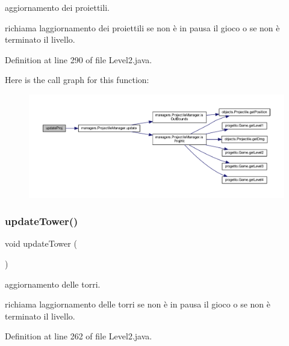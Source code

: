 aggiornamento dei proiettili. 

richiama l\textquotesingle{}aggiornamento dei proiettili se non è in pausa il gioco o se non è terminato il livello. 

Definition at line 290 of file Level2.\+java.

Here is the call graph for this function\+:
\nopagebreak
\begin{figure}[H]
\begin{center}
\leavevmode
\includegraphics[width=350pt]{classscenes_1_1_level2_ac83c203b559f6fd0bb225744d7ccf854_cgraph}
\end{center}
\end{figure}
\mbox{\label{classscenes_1_1_level2_ae4fd4a959e4d782a5e7ac0eff77ba27f}} 
\subsubsection{\texorpdfstring{update\+Tower()}{updateTower()}}
{\footnotesize\ttfamily void update\+Tower (\begin{DoxyParamCaption}{ }\end{DoxyParamCaption})}



aggiornamento delle torri. 

richiama l\textquotesingle{}aggiornamento delle torri se non è in pausa il gioco o se non è terminato il livello. 

Definition at line 262 of file Level2.\+java.

